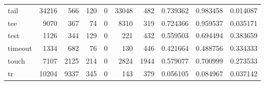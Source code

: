 \begin{longtable}{lrrrrrrrrr}
tail      &                               34216 &                                             566 &                                            120 &                                             0 &                                          33048 &                                          482 &                                           0.739362 &                               0.983458 &                             0.014087 \\
tee       &                                9070 &                                             367 &                                             74 &                                             0 &                                           8310 &                                          319 &                                           0.724366 &                               0.959537 &                             0.035171 \\
test      &                                1126 &                                             344 &                                            129 &                                             0 &                                            221 &                                          432 &                                           0.559503 &                               0.694494 &                             0.383659 \\
timeout   &                                1334 &                                             682 &                                             76 &                                             0 &                                            130 &                                          446 &                                           0.421664 &                               0.488756 &                             0.334333 \\
touch     &                                7107 &                                            2125 &                                            214 &                                             0 &                                           2824 &                                         1944 &                                           0.579077 &                               0.700999 &                             0.273533 \\
tr        &                               10204 &                                            9337 &                                            345 &                                             0 &                                            143 &                                          379 &                                           0.056105 &                               0.084967 &                             0.037142 \\

\end{longtable}

